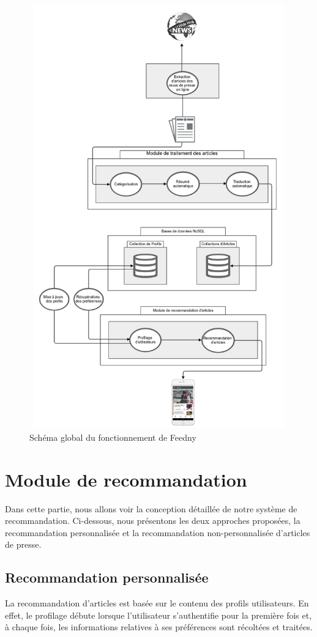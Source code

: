 \begin{figure}[H]
    \centering
    \includegraphics[height=520pt,width=380pt]{img/chapter3/global.png}
    \caption{Schéma global du fonctionnement de \textquotedbl Feedny\textquotedbl }
    \label{shemaglobal}
\end{figure}

\section{Module de recommandation}
Dans cette partie, nous allons voir la conception détaillée de notre système de recommandation. Ci-dessous, nous présentons les deux approches proposées, la recommandation personnalisée et la recommandation non-personnalisée d'articles de presse.
    \subsection{Recommandation personnalisée\label{personal}}
    La recommandation d'articles est basée sur le contenu des profils utilisateurs. En effet, le profilage débute lorsque l'utilisateur s'authentifie pour la première fois et, à chaque fois, les informations relatives à ses préférences sont récoltées et traitées.


